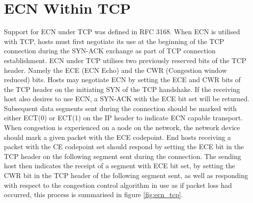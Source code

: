 \documentclass{l4proj}
\begin{document}
\section{ECN Within TCP}
\label{sec:ecntcp}

Support for ECN under TCP was defined in RFC 3168\cite{rfc3168}. When ECN is utilised with TCP, hosts must first negotiate its use at the beginning of the TCP connection during the SYN-ACK exchange as part of TCP connection establishment. ECN under TCP utilises two previously reserved bits of the TCP header. Namely the ECE (ECN Echo) and the CWR (Congestion window reduced) bits. Hosts may negotiate ECN by setting the ECE and CWR bits of the TCP header on the initiating SYN of the TCP handshake. If the receiving host also desires to use ECN, a SYN-ACK with the ECE bit set will be returned. Subsequent data segments sent during the connection should be marked with either ECT(0) or ECT(1) on the IP header to indicate ECN capable transport. When congestion is experienced on a node on the network, the network device should mark a given packet with the ECE codepoint. End hosts receiving a packet with the CE codepoint set should respond by setting the ECE bit in the TCP header on the following segment sent during the connection. The sending host then indicates the receipt of a segment with ECE bit set, by setting the CWR bit in the TCP header of the following segment sent, as well as responding with respect to the congestion control algorithm in use as if packet loss had occurred, this process is summarised in figure \ref{fig:ecn_tcp}.
\end{document}
